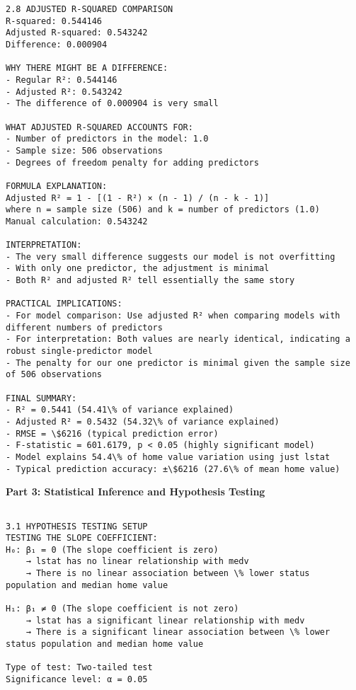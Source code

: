 \documentclass[8pt, twocolumn]{extarticle}
\begin{document}
    \begin{Verbatim}[commandchars=\\\{\}]
2.8 ADJUSTED R-SQUARED COMPARISON
R-squared: 0.544146
Adjusted R-squared: 0.543242
Difference: 0.000904

WHY THERE MIGHT BE A DIFFERENCE:
- Regular R²: 0.544146
- Adjusted R²: 0.543242
- The difference of 0.000904 is very small

WHAT ADJUSTED R-SQUARED ACCOUNTS FOR:
- Number of predictors in the model: 1.0
- Sample size: 506 observations
- Degrees of freedom penalty for adding predictors

FORMULA EXPLANATION:
Adjusted R² = 1 - [(1 - R²) × (n - 1) / (n - k - 1)]
where n = sample size (506) and k = number of predictors (1.0)
Manual calculation: 0.543242

INTERPRETATION:
- The very small difference suggests our model is not overfitting
- With only one predictor, the adjustment is minimal
- Both R² and adjusted R² tell essentially the same story

PRACTICAL IMPLICATIONS:
- For model comparison: Use adjusted R² when comparing models with different numbers of predictors
- For interpretation: Both values are nearly identical, indicating a robust single-predictor model
- The penalty for our one predictor is minimal given the sample size of 506 observations

FINAL SUMMARY:
- R² = 0.5441 (54.41\% of variance explained)
- Adjusted R² = 0.5432 (54.32\% of variance explained)
- RMSE = \$6216 (typical prediction error)
- F-statistic = 601.6179, p < 0.05 (highly significant model)
- Model explains 54.4\% of home value variation using just lstat
- Typical prediction accuracy: ±\$6216 (27.6\% of mean home value)
    \end{Verbatim}

    \textbf{Part 3: Statistical Inference and Hypothesis Testing}

    \begin{Verbatim}[commandchars=\\\{\}]

3.1 HYPOTHESIS TESTING SETUP
TESTING THE SLOPE COEFFICIENT:
H₀: β₁ = 0 (The slope coefficient is zero)
    → lstat has no linear relationship with medv
    → There is no linear association between \% lower status population and median home value

H₁: β₁ ≠ 0 (The slope coefficient is not zero)
    → lstat has a significant linear relationship with medv
    → There is a significant linear association between \% lower status population and median home value

Type of test: Two-tailed test
Significance level: α = 0.05
    \end{Verbatim}
\end{document}
